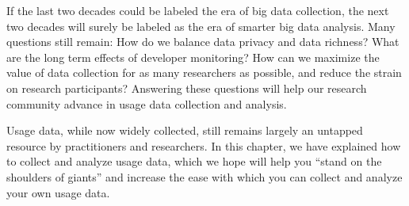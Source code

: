 If the last two decades could be labeled the era
of big data collection, 
the next two decades will surely be labeled as the 
era of smarter big data analysis.
Many questions still remain:
How do we balance data privacy and data richness?
What are the long term effects of developer monitoring?
How can we maximize the value of data collection
for as many researchers as possible, and reduce the 
strain on research participants?
Answering these questions will help our research
community advance in usage data collection and analysis.

Usage data, while now widely collected, still remains largely 
an untapped resource by practitioners and researchers.
In this chapter, we have explained how to collect and 
analyze usage data, which we hope will help you ``stand
on the shoulders of giants'' and increase the ease
with which you can collect and analyze your own usage data.


